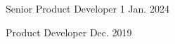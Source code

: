 


\begin{cvhonors}

  \cvhonor
    {Senior Product Developer} %
    {1} %
    {Jan. 2024} %
    {} %

  \cvhonor
    {Product Developer} %
    {} %
    {Dec. 2019} %
    {} %

\end{cvhonors}